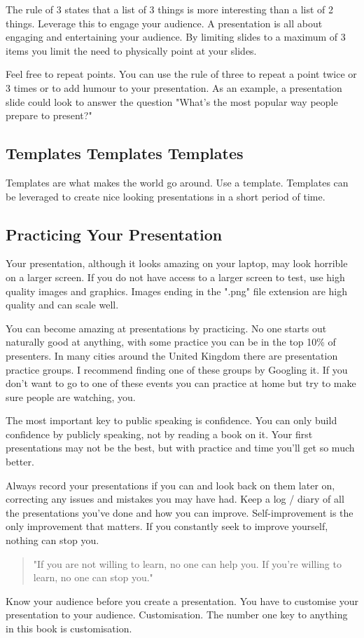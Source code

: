\documentclass{article}
\begin{document}
The rule of 3 states that a list of 3 things is more interesting than a
list of 2 things. Leverage this to engage your audience. A presentation
is all about engaging and entertaining your audience. By limiting slides
to a maximum of 3 items you limit the need to physically point at your
slides.

Feel free to repeat points. You can use the rule of three to repeat a
point twice or 3 times or to add humour to your presentation. As an
example, a presentation slide could look to answer the question "What's
the most popular way people prepare to present?"
\subsection{Templates Templates Templates}
Templates are what makes the world go around. Use a template. Templates
can be leveraged to create nice looking presentations in a short period
of time.
\subsection{Practicing Your Presentation}
Your presentation, although it looks amazing on your laptop, may look
horrible on a larger screen. If you do not have access to a larger
screen to test, use high quality images and graphics. Images ending in
the ".png" file extension are high quality and can scale well.

You can become amazing at presentations by practicing. No one starts out
naturally good at anything, with some practice you can be in the top
10\% of presenters. In many cities around the United Kingdom there are
presentation practice groups. I recommend finding one of these groups by
Googling it. If you don't want to go to one of these events you can
practice at home but try to make sure people are watching, you.

The most important key to public speaking is confidence. You can only
build confidence by publicly speaking, not by reading a book on it. Your
first presentations may not be the best, but with practice and time
you'll get so much better.

Always record your presentations if you can and look back on them later
on, correcting any issues and mistakes you may have had. Keep a log /
diary of all the presentations you've done and how you can improve.
Self-improvement is the only improvement that matters. If you constantly
seek to improve yourself, nothing can stop you.
\begin{quote}
    "If you are not willing to learn, no one can help you. If you're willing
to learn, no one can stop you."
\end{quote}
Know your audience before you create a presentation. You have to
customise your presentation to your audience. Customisation. The number
one key to anything in this book is customisation.
\end{document}
